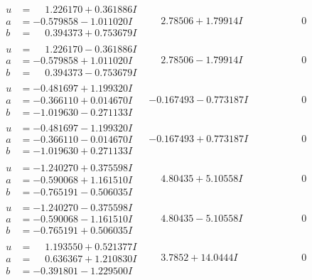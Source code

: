 \documentclass[1p]{elsarticle_modified}
\theoremstyle{definition}
\begin{document}
$$\begin{array}{c|c|c}
\begin{aligned}
u &= \phantom{-}1.226170 + 0.361886 I \\
a &= -0.579858 - 1.011020 I \\
b &= \phantom{-}0.394373 + 0.753679 I\end{aligned}
 & \phantom{-}2.78506 + 1.79914 I & \phantom{-0.000000 } 0 \\ \hline\begin{aligned}
u &= \phantom{-}1.226170 - 0.361886 I \\
a &= -0.579858 + 1.011020 I \\
b &= \phantom{-}0.394373 - 0.753679 I\end{aligned}
 & \phantom{-}2.78506 - 1.79914 I & \phantom{-0.000000 } 0 \\ \hline\begin{aligned}
u &= -0.481697 + 1.199320 I \\
a &= -0.366110 + 0.014670 I \\
b &= -1.019630 - 0.271133 I\end{aligned}
 & -0.167493 - 0.773187 I & \phantom{-0.000000 } 0 \\ \hline\begin{aligned}
u &= -0.481697 - 1.199320 I \\
a &= -0.366110 - 0.014670 I \\
b &= -1.019630 + 0.271133 I\end{aligned}
 & -0.167493 + 0.773187 I & \phantom{-0.000000 } 0 \\ \hline\begin{aligned}
u &= -1.240270 + 0.375598 I \\
a &= -0.590068 + 1.161510 I \\
b &= -0.765191 - 0.506035 I\end{aligned}
 & \phantom{-}4.80435 + 5.10558 I & \phantom{-0.000000 } 0 \\ \hline\begin{aligned}
u &= -1.240270 - 0.375598 I \\
a &= -0.590068 - 1.161510 I \\
b &= -0.765191 + 0.506035 I\end{aligned}
 & \phantom{-}4.80435 - 5.10558 I & \phantom{-0.000000 } 0 \\ \hline\begin{aligned}
u &= \phantom{-}1.193550 + 0.521377 I \\
a &= \phantom{-}0.636367 + 1.210830 I \\
b &= -0.391801 - 1.229500 I\end{aligned}
 & \phantom{-}3.7852 + 14.0444 I & \phantom{-0.000000 } 0 \\ \hline\begin{aligned}

\end{aligned}
\end{array}$$
\end{document}
